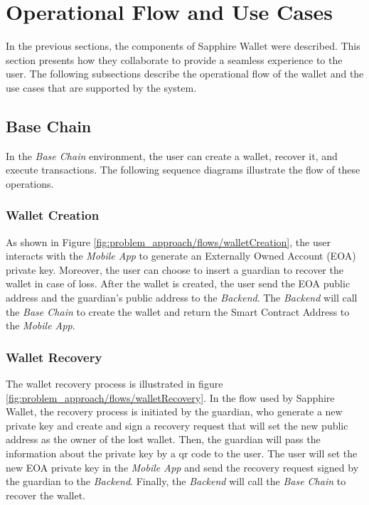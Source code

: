 \section{Operational Flow and Use Cases}
\label{sec:operational_flow_and_use_cases}

In the previous sections, the components of Sapphire Wallet were described. This section presents how they collaborate to provide a seamless experience to the user. The following subsections describe the operational flow of the wallet and the use cases that are supported by the system.

\subsection{Base Chain}

In the \textit{Base Chain} environment, the user can create a wallet, recover it, and execute transactions. The following sequence diagrams illustrate the flow of these operations.

\subsubsection{Wallet Creation}


As shown in Figure \ref{fig:problem_approach/flows/walletCreation}, the user interacts with the \textit{Mobile App} to generate an Externally Owned Account (EOA) private key. Moreover, the user can choose to insert a guardian to recover the wallet in case of loss. After the wallet is created, the user send the EOA public address and the guardian's public address to the \textit{Backend}. The \textit{Backend} will call the \textit{Base Chain} to create the wallet and return the Smart Contract Address to the \textit{Mobile App}.


\subsubsection{Wallet Recovery}


The wallet recovery process is illustrated in figure \ref{fig:problem_approach/flows/walletRecovery}. In the flow used by Sapphire Wallet, the recovery process is initiated by the guardian, who generate a new private key and create and sign a recovery request that will set the new public address as the owner of the lost wallet. Then, the guardian will pass the information about the private key by a qr code to the user. The user will set the new EOA private key in the \textit{Mobile App} and send the recovery request signed by the guardian to the \textit{Backend}. Finally, the \textit{Backend} will call the \textit{Base Chain} to recover the wallet.

